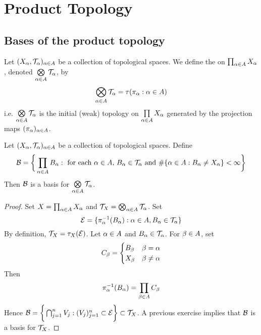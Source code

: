 \documentclass{book}
\begin{document}
	
	
	
	
	
	
	
	
	
	
	
	
	
	\newpage
	\section{Product Topology}
	
	\subsection{Bases of the product topology}
	
	\begin{defn} 
	Let $(X_{\alpha}, \mathcal{T}_{\alpha})_{\alpha \in A}$ be a collection of topological spaces. We define the  on $\prod_{\alpha \in A}X_{\alpha}$, denoted $\bigotimes\limits_{\alpha \in A} \mathcal{T}_{\alpha}$, by 
	$$\bigotimes\limits_{\alpha \in A} \mathcal{T}_{\alpha} = \tau(\pi_{\alpha}: {\alpha \in A})$$
	i.e. $\bigotimes\limits_{\alpha \in A} \mathcal{T}_{\alpha} $ is the initial (weak) topology on $\prod\limits_{\alpha \in A} X_{\alpha}$ generated by the projection maps $(\pi_{\alpha})_{\alpha \in A}$.
	\end{defn}

	\begin{ex} 
		Let $(X_{\alpha}, \mathcal{T}_{\alpha})_{\alpha \in A}$ be a collection of topological spaces. Define 
		$$\mathcal{B} = \bigg \{\prod_{\alpha \in A}B_{\alpha}: \text{ for each $\alpha \in A$,  $B_{\alpha} \in \mathcal{T}_{\alpha}$ and $\# \{\alpha \in A: B_{\alpha} \neq X_{\alpha}\} < \infty$} \bigg\}$$
		Then $\mathcal{B}$ is a basis for $\bigotimes\limits_{\alpha \in A} \mathcal{T}_{\alpha}$.
	\end{ex}

	\begin{proof}
		Set $X = \prod_{\alpha \in A}X_{\alpha}$ and $\mathcal{T}_X = \bigotimes_{\alpha \in A} \mathcal{T}_{\alpha}$. Set 
		$$\mathcal{E} = \{\pi_{\alpha}^{-1}(B_{\alpha}): \alpha \in A, B_{\alpha} \in \mathcal{T}_{\alpha}\}$$ 
		By definition, $\mathcal{T}_{X} = \tau_{X}(\mathcal{E})$. Let $\alpha \in A$ and $B_{\alpha} \in \mathcal{T}_{\alpha}$. For $\beta \in A$, set 
		\[
		C_{\beta} = 
		\begin{cases}
			B_{\beta} & \beta = \alpha \\
			X_{\beta} & \beta \neq \alpha
		\end{cases}
		\]
		Then 
		\begin{align*}
			\pi_{\alpha}^{-1}(B_{\alpha}) = \prod_{\beta \in A} C_{\beta}  
		\end{align*}
		Hence $\mathcal{B} = \bigg \{\bigcap_{j=1}^n V_j:(V_j)_{j=1}^n \subset \mathcal{E} \bigg \} \subset \mathcal{T}_X$. A previous exercise implies that $\mathcal{B}$ is a basis for $\mathcal{T}_X$.
	\end{proof}
\end{document}
